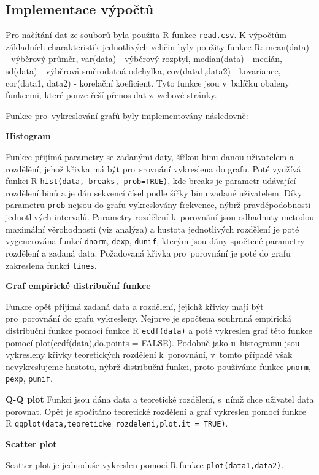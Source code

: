 \documentclass[thesis=B,czech]{FITthesis}[2012/06/26]
\begin{document}
\subsection{Implementace výpočtů}
\begin{sloppypar} Pro načítání dat ze souborů byla použita R funkce \texttt{read.csv}.
K výpočtům základních charakteristik jednotlivých veličin byly použity funkce R: mean(data) - výběrový průměr, var(data) - výběrový rozptyl, median(data) - medián, sd(data) - výběrová směrodatná odchylka, cov(data1,data2) - kovariance, cor(data1, data2) - korelační koeficient. Tyto funkce jsou v~balíčku obaleny funkcemi, které pouze řeší přenos dat z~webové stránky.\end{sloppypar}
Funkce pro~vykreslování grafů byly implementovány následovně: 
\begin{itemize}
\item \textbf{Histogram}\begin{sloppypar} Funkce přijímá parametry se zadanými daty, šířkou binu danou uživatelem a rozdělění, jehož křivka má být pro~srovnání vykreslena do grafu. Poté využívá funkci R \texttt{hist(data, breaks, prob=TRUE)}, kde breaks je parametr udávající rozdělení binů a je dán sekvencí čísel podle šířky binu zadané uživatelem. Díky parametru \texttt{prob} nejsou do grafu vykreslovány frekvence, nýbrž pravděpodobnosti jednotlivých intervalů. Parametry rozdělení k~porovnání jsou odhadnuty metodou maximální věrohodnosti (viz analýza) a hustota jednotlivých rozdělení je poté vygenerována funkcí \texttt{dnorm}, \texttt{dexp}, \texttt{dunif}, kterým jsou dány spočtené parametry rozdělení a zadaná data. Požadovaná křivka pro~porovnání je poté do grafu zakreslena funkcí \texttt{lines}.\end{sloppypar}
\item \textbf{Graf empirické distribuční funkce}\begin{sloppypar} Funkce opět přijímá zadaná data a rozdělení, jejichž křivky mají být pro~porovnání do grafu vykresleny. Nejprve je spočtena souhrnná empirická distribuční funkce pomocí funkce R \texttt{ecdf(data)} a poté vykreslen graf této funkce pomocí plot(ecdf(data),do.points = FALSE). Podobně jako u~histogramu jsou vykresleny křivky teoretických rozdělení k~porovnání, v~tomto případě však nevykreslujeme hustotu, nýbrž distribuční funkci, proto používáme funkce \texttt{pnorm}, \texttt{pexp}, \texttt{punif}.
\item \textbf{Q-Q plot} Funkci jsou dána data a teoretické rozdělení, s~nímž chce uživatel data porovnat. Opět je spočítáno teoretické rozdělení a graf vykreslen pomocí funkce R \texttt{qqplot(data,teoreticke\_rozdeleni,plot.it = TRUE)}.\end{sloppypar}
\item \textbf{Scatter plot}\begin{sloppypar} Scatter plot je jednoduše vykreslen pomocí R funkce 
\texttt{plot(data1,data2)}.\end{sloppypar}
\end{itemize}
\end{document}
